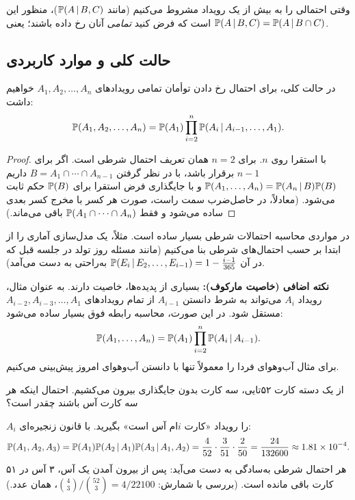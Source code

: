 \begin{note}
\notetitle وقتی احتمالی را به بیش از یک رویداد مشروط می‌کنیم (مانند $\mathbb{P}(A\,|\, B,C)$)، منظور این است که فرض کنید \emph{تمامی} آنان رخ داده باشند؛ یعنی $\mathbb{P}(A\,|\, B,C)=\mathbb{P}(A\,|\, B\cap C)$.
\end{note}

\subsection{حالت کلی و موارد کاربردی}

\begin{theorem}
در حالت کلی، برای احتمال رخ دادن توأمان تمامی رویدادهای $A_1,A_2,\ldots,A_n$ خواهیم داشت:
\[
\mathbb{P}(A_1,A_2,\ldots,A_n)=\mathbb{P}(A_1)\prod_{i=2}^{n}\mathbb{P}(A_i\,|\, A_{i-1},\ldots,A_1).
\]
\end{theorem}
\begin{proof}
با استقرا روی $n$. برای $n=2$ همان تعریف احتمال شرطی است. اگر برای $n-1$ برقرار باشد، با در نظر گرفتن $B=A_1\cap\cdots\cap A_{n-1}$ داریم
$\mathbb{P}(A_1,\ldots,A_n)=\mathbb{P}(A_n\,|\, B)\mathbb{P}(B)$ و با جایگذاری فرض استقرا برای $\mathbb{P}(B)$ حکم ثابت می‌شود. (معادلاً، در حاصل‌ضرب سمت راست، صورت هر کسر با مخرج کسر بعدی ساده می‌شود و فقط $\mathbb{P}(A_1\cap\cdots\cap A_n)$ باقی می‌ماند.)
\end{proof}

در مواردی محاسبه احتمالات شرطی بسیار ساده است. مثلاً، یک مدل‌سازی آماری را از ابتدا بر حسب احتمال‌های شرطی بنا می‌کنیم (مانند مسئله روز تولد در جلسه قبل که در آن $\mathbb{P}(E_i\,|\, E_2,\ldots,E_{i-1})=1-\frac{i-1}{365}$ به‌راحتی به دست می‌آمد).

\begin{note}
\notetitle \textbf{نکته اضافی (خاصیت مارکوف):} بسیاری از پدیده‌ها، خاصیت  دارند. به عنوان مثال، رویداد $A_i$ می‌تواند به شرط دانستن $A_{i-1}$ از تمام رویدادهای $A_{i-2},A_{i-3},\ldots,A_1$ مستقل شود. در این صورت، محاسبه رابطه فوق بسیار ساده می‌شود:
\[
\mathbb{P}(A_1,\ldots,A_n)=\mathbb{P}(A_1)\prod_{i=2}^{n}\mathbb{P}(A_i\,|\, A_{i-1}).
\]
برای مثال آب‌وهوای فردا را معمولاً تنها با دانستن آب‌وهوای امروز پیش‌بینی می‌کنیم.
\end{note}

\begin{example}
از یک دسته کارت ۵۲تایی، سه کارت بدون جایگذاری بیرون می‌کشیم. احتمال اینکه هر سه کارت آس باشند چقدر است؟
\begin{solution}
$A_i$ را رویداد «کارت $i$ام آس است» بگیرید. با قانون زنجیره‌ای:
\[
\mathbb{P}(A_1,A_2,A_3)=\mathbb{P}(A_1)\mathbb{P}(A_2\,|\, A_1)\mathbb{P}(A_3\,|\, A_1,A_2)=\frac4{52}\cdot\frac3{51}\cdot\frac2{50}=\frac{24}{132600}\approx1.81\times10^{-4}.
\]
هر احتمال شرطی به‌سادگی به دست می‌آید: پس از بیرون آمدن یک آس، ۳ آس در ۵۱ کارت باقی مانده است. (بررسی با شمارش: $\binom43/\binom{52}3=4/22100$، همان عدد.)
\end{solution}
\end{example}

